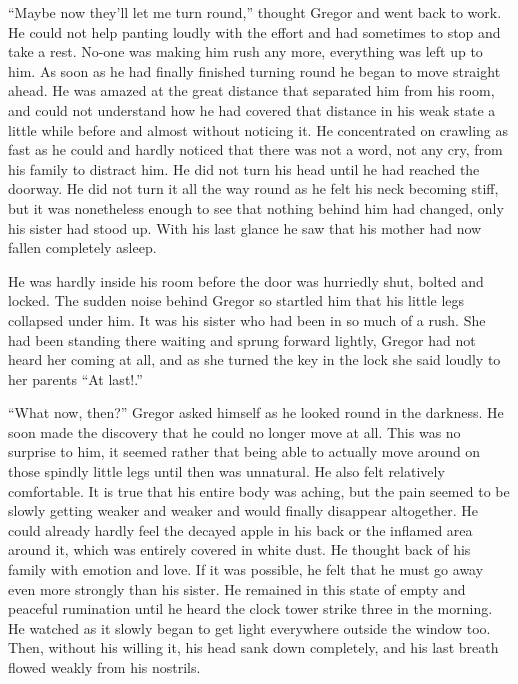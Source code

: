 \documentclass[12pt]{report}
\begin{document}
``Maybe now they'll let me turn round,'' thought Gregor and went back to
work. He could not help panting loudly with the effort and had sometimes
to stop and take a rest. No-one was making him rush any more, everything
was left up to him. As soon as he had finally finished turning round he
began to move straight ahead. He was amazed at the great distance that
separated him from his room, and could not understand how he had covered
that distance in his weak state a little while before and almost without
noticing it. He concentrated on crawling as fast as he could and hardly
noticed that there was not a word, not any cry, from his family to
distract him. He did not turn his head until he had reached the doorway.
He did not turn it all the way round as he felt his neck becoming stiff,
but it was nonetheless enough to see that nothing behind him had
changed, only his sister had stood up. With his last glance he saw that
his mother had now fallen completely asleep.

He was hardly inside his room before the door was hurriedly shut, bolted
and locked. The sudden noise behind Gregor so startled him that his
little legs collapsed under him. It was his sister who had been in so
much of a rush. She had been standing there waiting and sprung forward
lightly, Gregor had not heard her coming at all, and as she turned the
key in the lock she said loudly to her parents ``At last!.''

``What now, then?'' Gregor asked himself as he looked round in the
darkness. He soon made the discovery that he could no longer move at
all. This was no surprise to him, it seemed rather that being able to
actually move around on those spindly little legs until then was
unnatural. He also felt relatively comfortable. It is true that his
entire body was aching, but the pain seemed to be slowly getting weaker
and weaker and would finally disappear altogether. He could already
hardly feel the decayed apple in his back or the inflamed area around
it, which was entirely covered in white dust. He thought back of his
family with emotion and love. If it was possible, he felt that he must
go away even more strongly than his sister. He remained in this state of
empty and peaceful rumination until he heard the clock tower strike
three in the morning. He watched as it slowly began to get light
everywhere outside the window too. Then, without his willing it, his
head sank down completely, and his last breath flowed weakly from his
nostrils.
\end{document}
